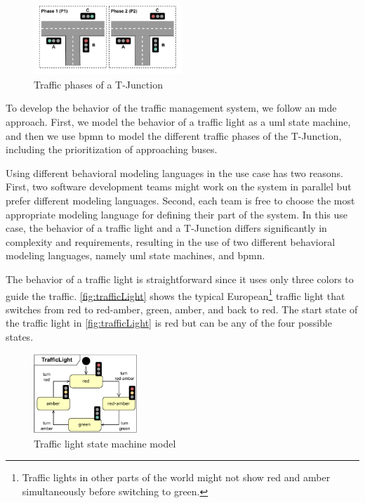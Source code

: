 \documentclass{jot}
\begin{document}
\begin{figure}[h]
    \centering
    \includegraphics[width=0.5\textwidth]{figures/phases.pdf}
    \caption{Traffic phases of a T-Junction}
    \label{fig:junction-phases}
\end{figure}

To develop the behavior of the traffic management system, we follow an \gls*{mde} approach.
First, we model the behavior of a traffic light as a \gls*{uml} state machine, and then we use \gls*{bpmn} to model the different traffic phases of the T-Junction, including the prioritization of approaching buses.

Using different behavioral modeling languages in the use case has two reasons.
First, two software development teams might work on the system in parallel but prefer different modeling languages.
Second, each team is free to choose the most appropriate modeling language for defining their part of the system.
In this use case, the behavior of a traffic light and a T-Junction differs significantly in complexity and requirements, resulting in the use of two different behavioral modeling languages, namely \gls*{uml} state machines, and \gls*{bpmn}.

The behavior of a traffic light is straightforward since it uses only three colors to guide the traffic.
\autoref{fig:trafficLight} shows the typical European\footnote{Traffic lights in other parts of the world might not show red and amber simultaneously before switching to green.} traffic light that switches from \textsf{red} to \textsf{red-amber}, \textsf{green}, \textsf{amber}, and back to \textsf{red}.
The start state of the traffic light in \autoref{fig:trafficLight} is \textsf{red} but can be any of the four possible states.

\begin{figure}[h]
    \centering
    \includegraphics[width=0.35\textwidth]{figures/trafficLight.pdf}
    \caption{Traffic light state machine model}
    \label{fig:trafficLight}
\end{figure}
\end{document}

